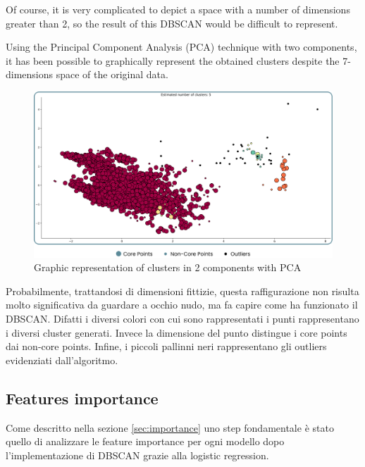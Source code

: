 Of course, it is very complicated to depict a space with a number of dimensions greater than 2, so the result of this DBSCAN would be difficult to represent.

Using the Principal Component Analysis (PCA) technique with two components, it has been possible to graphically represent the obtained clusters despite the 7-dimensions space of the original data.

\begin{figure}[H]
    \centering
    \includegraphics[width=13cm]{Images/3/clusters.png}
    \caption{Graphic representation of clusters in 2 components with PCA}
\end{figure}

Probabilmente, trattandosi di dimensioni fittizie, questa raffigurazione non risulta molto significativa da guardare a occhio nudo, ma fa capire come ha funzionato il DBSCAN. Difatti i diversi colori con cui sono rappresentati i punti rappresentano i diversi cluster generati. Invece la dimensione del punto distingue i core points dai non-core points. Infine, i piccoli pallinni neri rappresentano gli outliers evidenziati dall'algoritmo.

\subsection{Features importance}
\label{sec:testing-importance}

Come descritto nella sezione \ref{sec:importance} uno step fondamentale è stato quello di analizzare le feature importance per ogni modello dopo l'implementazione di DBSCAN grazie alla logistic regression.


